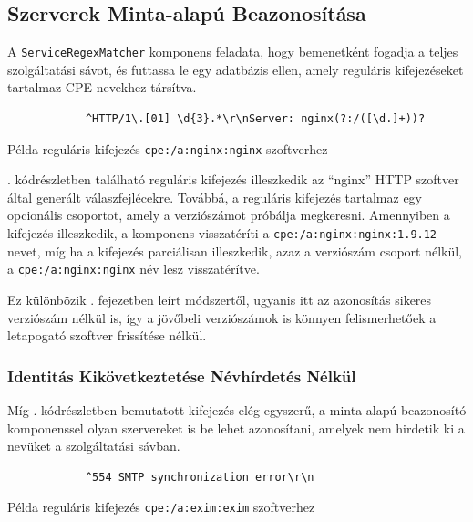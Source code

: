 \subsection*{Szerverek Minta-alapú Beazonosítása} \label{ssec:patternmatch}

	A \texttt{ServiceRegexMatcher} komponens feladata, hogy bemenetként fogadja a teljes szolgáltatási sávot, és futtassa le egy adatbázis ellen, amely reguláris kifejezéseket tartalmaz CPE nevekhez társítva.

	\begin{listing}[H]
		\begin{verbatim}
			^HTTP/1\.[01] \d{3}.*\r\nServer: nginx(?:/([\d.]+))?
		\end{verbatim}
		\caption{Példa reguláris kifejezés \texttt{cpe:/a:nginx:nginx} szoftverhez}
		\label{nginxregex}
	\end{listing}
	
	\Az{\ref{nginxregex}}. kódrészletben található reguláris kifejezés illeszkedik az ``nginx'' HTTP szoftver által generált válaszfejlécekre. Továbbá, a reguláris kifejezés tartalmaz egy opcionális csoportot, amely a verziószámot próbálja megkeresni. Amennyiben a kifejezés illeszkedik, a komponens visszatéríti a \texttt{cpe:/a:nginx:nginx:1.9.12} nevet, míg ha a kifejezés parciálisan illeszkedik, azaz a verziószám csoport nélkül, a \texttt{cpe:/a:nginx:nginx} név lesz visszatérítve.
	
	Ez különbözik \az{\ref{ssec:matchcpe}}. fejezetben leírt módszertől, ugyanis itt az azonosítás sikeres verziószám nélkül is, így a jövőbeli verziószámok is könnyen felismerhetőek a letapogató szoftver frissítése nélkül.
	
\subsubsection*{Identitás Kikövetkeztetése Névhírdetés Nélkül}
	
	Míg \az{\ref{nginxregex}}. kódrészletben bemutatott kifejezés elég egyszerű, a minta alapú beazonosító komponenssel olyan szervereket is be lehet azonosítani, amelyek nem hirdetik ki a nevüket a szolgáltatási sávban.
	
	\begin{listing}[H]
		\begin{verbatim}
			^554 SMTP synchronization error\r\n
		\end{verbatim}
		\caption{Példa reguláris kifejezés \texttt{cpe:/a:exim:exim} szoftverhez}
		\label{eximregex}
	\end{listing}
	

